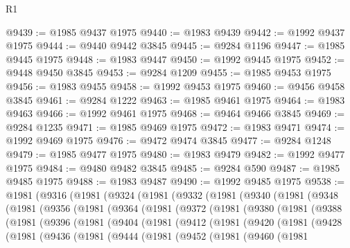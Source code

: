 \begin{lexlean}{R1}
\begin{coremodule}
@9439 := @1985 @9437 @1975
@9440 := @1983 @9439
@9442 := @1992 @9437 @1975
@9444 := @9440 @9442 @3845
@9445 := @9284 @1196
@9447 := @1985 @9445 @1975
@9448 := @1983 @9447
@9450 := @1992 @9445 @1975
@9452 := @9448 @9450 @3845
@9453 := @9284 @1209
@9455 := @1985 @9453 @1975
@9456 := @1983 @9455
@9458 := @1992 @9453 @1975
@9460 := @9456 @9458 @3845
@9461 := @9284 @1222
@9463 := @1985 @9461 @1975
@9464 := @1983 @9463
@9466 := @1992 @9461 @1975
@9468 := @9464 @9466 @3845
@9469 := @9284 @1235
@9471 := @1985 @9469 @1975
@9472 := @1983 @9471
@9474 := @1992 @9469 @1975
@9476 := @9472 @9474 @3845
@9477 := @9284 @1248
@9479 := @1985 @9477 @1975
@9480 := @1983 @9479
@9482 := @1992 @9477 @1975
@9484 := @9480 @9482 @3845
@9485 := @9284 @590
@9487 := @1985 @9485 @1975
@9488 := @1983 @9487
@9490 := @1992 @9485 @1975
@9538 := @1981
    (@9316
      (@1981
        (@9324
          (@1981
            (@9332
              (@1981
                (@9340
                  (@1981
                    (@9348
                      (@1981
                        (@9356
                          (@1981
                            (@9364
                              (@1981
                                (@9372
                                  (@1981
                                    (@9380
                                      (@1981
                                        (@9388
                                          (@1981
                                            (@9396
                                              (@1981
                                                (@9404
                                                  (@1981
                                                    (@9412
                                                      (@1981
                                                        (@9420
                                                          (@1981
                                                            (@9428
                                                              (@1981
                                                                (@9436
                                                                  (@1981
                                                                    (@9444
                                                                      (@1981
                                                                        (@9452
                                                                          (@1981
                                                                            (@9460
                                                                              (@1981

\end{coremodule}
\end{lexlean}
